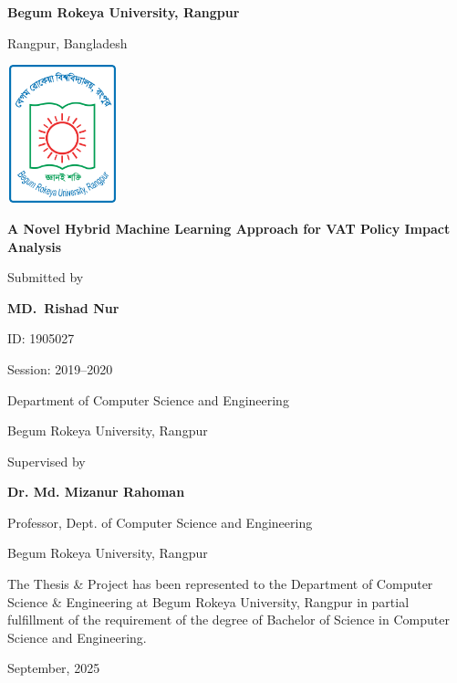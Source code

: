 \begin{titlepage}
    \centering
        
        {\LARGE\bfseries Begum Rokeya University, Rangpur\par}
        {\large Rangpur, Bangladesh\par}
        
        \vspace{1cm}
        
        \includegraphics[width=3.2cm,height=4cm]{images/BRUR_Logo.png}
        
        \vspace{1cm}
        
        {\LARGE\bfseries A Novel Hybrid Machine Learning Approach for VAT Policy Impact Analysis\par}
        

        \vspace{2cm}
        
        Submitted by\par
        \textbf{MD.\ Rishad Nur}\par
        ID: 1905027\par
        Session: 2019--2020\par
        Department of Computer Science and Engineering\par
        Begum Rokeya University, Rangpur\par

        \vspace{1cm}

        Supervised by\par
        \textbf{Dr. Md. Mizanur Rahoman}\par
        Professor, Dept. of Computer Science and Engineering\par
        Begum Rokeya University, Rangpur\par

        \vspace{3cm}
        
        {\small
        \begin{flushleft}
        The Thesis \& Project has been represented to the Department of Computer Science \& Engineering at Begum Rokeya University, Rangpur in partial fulfillment of the requirement of the degree of Bachelor of Science in Computer Science and Engineering.
        \end{flushleft}
        }

        \vspace{1cm}

        { \large
            September, 2025
        }
\end{titlepage}

